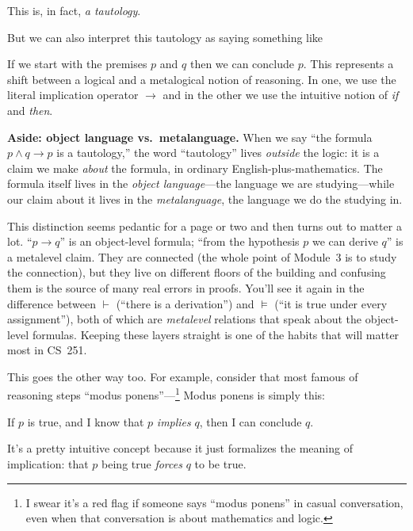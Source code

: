 \documentclass[11pt]{article}
\begin{document}
This is, in fact, \emph{a tautology}.

But we can also interpret this tautology as saying something like

If we start with the premises $p$ and $q$ then we can conclude $p$. This represents a shift between a logical and a metalogical notion of reasoning. In one, we use the literal implication operator $\to$ and in the other we use the intuitive notion of \emph{if} and \emph{then}.

\begin{mdframed}[linewidth=0.6pt, linecolor=gray!60, backgroundcolor=gray!4, innertopmargin=6pt, innerbottommargin=6pt, nobreak=true]
\textbf{Aside: object language vs.\ metalanguage.} When we say ``the formula $p \wedge q \to p$ is a tautology,'' the word ``tautology'' lives \emph{outside} the logic: it is a claim we make \emph{about} the formula, in ordinary English-plus-mathematics. The formula itself lives in the \emph{object language}---the language we are studying---while our claim about it lives in the \emph{metalanguage}, the language we do the studying in.

This distinction seems pedantic for a page or two and then turns out to matter a lot. ``$p \to q$'' is an object-level formula; ``from the hypothesis $p$ we can derive $q$'' is a metalevel claim. They are connected (the whole point of Module~3 is to study the connection), but they live on different floors of the building and confusing them is the source of many real errors in proofs. You'll see it again in the difference between $\vdash$ (``there is a derivation'') and $\models$ (``it is true under every assignment''), both of which are \emph{metalevel} relations that speak about the object-level formulas. Keeping these layers straight is one of the habits that will matter most in CS~251.
\end{mdframed}

This goes the other way too. For example, consider that most famous of reasoning steps ``modus ponens''---\footnote{I swear it's a red flag if someone says ``modus ponens'' in casual conversation, even when that conversation is about mathematics and logic.} Modus ponens is simply this:

If $p$ is true, and I know that $p$ \emph{implies} $q$, then I can conclude $q$.

It's a pretty intuitive concept because it just formalizes the meaning of implication: that $p$ being true \emph{forces} $q$ to be true.
\end{document}
